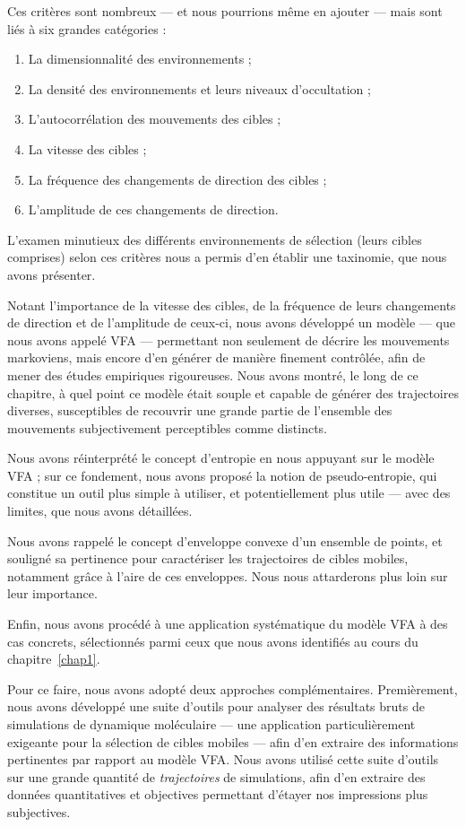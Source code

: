 	Ces critères sont nombreux --- et nous pourrions même en ajouter --- mais sont liés à six grandes catégories :
	
	\begin{enumerate}
		\item La dimensionnalité des environnements ;
		\item La densité des environnements et leurs niveaux d'occultation ;
		\item L'autocorrélation des mouvements des cibles ;
		\item La vitesse des cibles ;
		\item La fréquence des changements de direction des cibles ;
		\item L'amplitude de ces changements de direction.
	\end{enumerate}
	
	L'examen minutieux des différents environnements de sélection (leurs cibles comprises) selon ces critères nous a permis d'en établir une taxinomie, que nous avons présenter.
	
	Notant l'importance de la vitesse des cibles, de la fréquence de leurs changements de direction et de l'amplitude de ceux-ci, nous avons développé un modèle --- que nous avons appelé VFA --- permettant non seulement de décrire les mouvements markoviens, mais encore d'en générer de manière finement contrôlée, afin de mener des études empiriques rigoureuses. Nous avons montré, le long de ce chapitre, à quel point ce modèle était souple et capable de générer des trajectoires diverses, susceptibles de recouvrir une grande partie de l'ensemble des mouvements subjectivement perceptibles comme distincts.
	
	Nous avons réinterprété le concept d'entropie en nous appuyant sur le modèle VFA ; sur ce fondement, nous avons proposé la notion de pseudo-entropie, qui constitue un outil plus simple à utiliser, et potentiellement plus utile --- avec des limites, que nous avons détaillées.	
	
	Nous avons rappelé le concept d'enveloppe convexe d'un ensemble de points, et souligné sa pertinence pour caractériser les trajectoires de cibles mobiles, notamment grâce à l'aire de ces enveloppes. Nous nous attarderons plus loin sur leur importance.
	
	Enfin, nous avons procédé à une application systématique du modèle VFA à des cas concrets, sélectionnés parmi ceux que nous avons identifiés au cours du chapitre~\ref{chap1}.
	
	Pour ce faire, nous avons adopté deux approches complémentaires. Premièrement, nous avons développé une suite d'outils pour analyser des résultats bruts de simulations de dynamique moléculaire --- une application particulièrement exigeante pour la sélection de cibles mobiles --- afin d'en extraire des informations pertinentes par rapport au modèle VFA. Nous avons utilisé cette suite d'outils sur une grande quantité de \emph{trajectoires} de simulations, afin d'en extraire des données quantitatives et objectives permettant d'étayer nos impressions plus subjectives.
	
